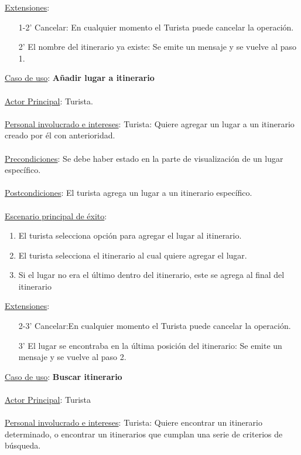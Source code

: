 \documentclass[12pt]{article}
\begin{document}
\underline{Extensiones}:
\begin{enumerate}
\item[1-2'] Cancelar: En cualquier momento el Turista puede cancelar la operación. 
\item[2'] El nombre del itinerario ya existe: Se emite un mensaje y se vuelve al paso 1.
\end{enumerate}
\underline{Caso de uso}: \textbf{Añadir lugar a itinerario}\\\\
\underline{Actor Principal}: Turista.\\\\
\underline{Personal involucrado e intereses}: Turista: Quiere agregar un lugar a un itinerario creado por él con anterioridad.\\\\
\underline{Precondiciones}:  Se debe haber estado en la parte de visualización de un lugar específico.\\\\
\underline{Postcondiciones}: El turista agrega un lugar a un itinerario específico.\\\\
\underline{Escenario principal de éxito}:
\begin{enumerate}
\item El turista selecciona opción para agregar el lugar al itinerario.
\item El turista selecciona el itinerario al cual quiere agregar el lugar.
\item Si el lugar no era el último dentro del itinerario, este se agrega al final del itinerario
\end{enumerate}
\underline{Extensiones}:
\begin{enumerate}
\item[2-3'] Cancelar:En cualquier momento el Turista puede cancelar la operación. 
\item[3'] El lugar se encontraba en la última posición del itinerario: Se emite un mensaje y se vuelve al paso 2.
\end{enumerate}
\underline{Caso de uso}: \textbf{Buscar itinerario}\\\\
\underline{Actor Principal}: Turista\\\\
\underline{Personal involucrado e intereses}: Turista: Quiere encontrar un itinerario determinado, o encontrar un itinerarios que cumplan una serie de criterios de búsqueda.\\\\
\end{document}
